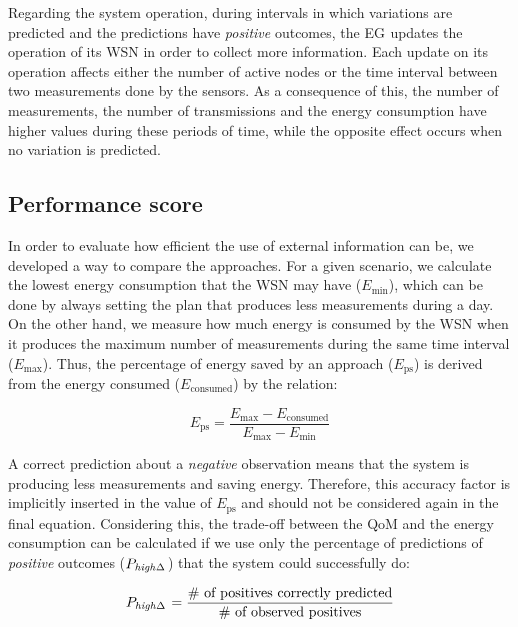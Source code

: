 \documentclass{llncs}
\newcommand{\EG}[1]{EG$_{\text{#1}}$}
\newcommand{\ourDelta}[2][]{\ensuremath{\Delta\textsuperscript{\text{#1}}
\textsubscript{\text{#2}}}}
\newcommand{\high}[1][ ]{\ensuremath{\text{\emph{high}}#1}}
\newcommand{\highDelta}[2][]{\high{\ourDelta[#1]{#2}}}
\begin{document}
Regarding the system operation, during intervals in which 
variations are predicted and the predictions have \emph{positive} outcomes, 
the \EG{} updates the operation of its WSN in order to collect more 
information. 
Each update on its operation affects either the number of active nodes or the 
time interval between two measurements done by the sensors. As a consequence of 
this, the number of measurements, the number of transmissions and the energy 
consumption have higher values during these periods of time, while the opposite 
effect occurs when no variation is predicted.

\subsection{Performance score}
\label{sec:performance}

In order to evaluate how efficient the use of external information can be, we 
developed a way to compare the approaches. For a given scenario, we calculate 
the lowest energy consumption that the WSN may have ($E_\text{min}$), which 
can be done by always setting the plan that produces less measurements during a 
day. On the other hand, we measure how much energy is consumed by the WSN when 
it produces the maximum number of measurements during the same time interval 
($E_\text{max}$). Thus, the percentage of energy saved by an approach 
($E_\text{ps}$) is derived from the energy consumed ($E_\text{consumed}$) by 
the 
relation:

\begin{equation}
E_\text{ps} = \frac{E_\text{max} - E_\text{consumed}}{E_\text{max} - 
E_\text{min}}
\end{equation}

A correct prediction about a \emph{negative} observation means that the 
system is producing less measurements and saving energy. Therefore, this 
accuracy factor is implicitly inserted in the value of $E_\text{ps}$ and should 
not be considered again in the final equation. Considering this, the trade-off 
between the QoM and the energy consumption can be calculated if we use only the 
percentage of predictions of \emph{positive} outcomes ($P_\text{\highDelta{}}$) 
that the system could successfully do:

\begin{equation}
P_\text{\highDelta{}} = \frac{\text{\# of positives correctly 
predicted}}{\text{\# of observed positives}}
\end{equation}
\end{document}
